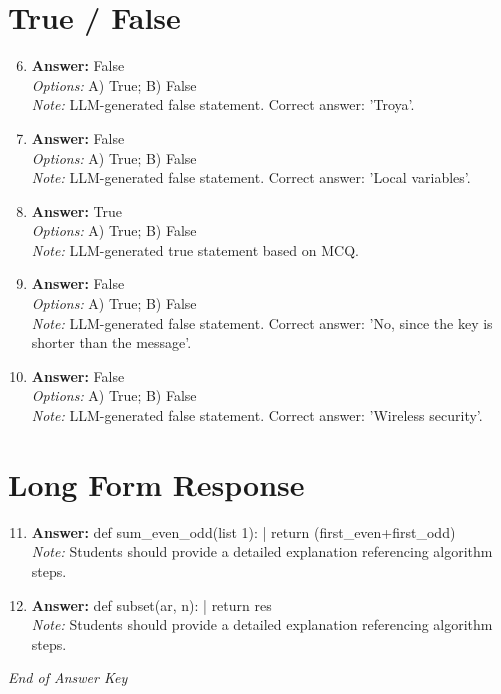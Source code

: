 \documentclass[12pt]{article}
\begin{document}
\section*{True / False}
\begin{enumerate}[label=\arabic*.]
\setcounter{enumi}{5}
\item \textbf{Answer:} False
\\ \textit{Options:} A) True; B) False
\\ \textit{Note:} LLM-generated false statement. Correct answer: 'Troya'.
\item \textbf{Answer:} False
\\ \textit{Options:} A) True; B) False
\\ \textit{Note:} LLM-generated false statement. Correct answer: 'Local variables'.
\item \textbf{Answer:} True
\\ \textit{Options:} A) True; B) False
\\ \textit{Note:} LLM-generated true statement based on MCQ.
\item \textbf{Answer:} False
\\ \textit{Options:} A) True; B) False
\\ \textit{Note:} LLM-generated false statement. Correct answer: 'No, since the key is shorter than the message'.
\item \textbf{Answer:} False
\\ \textit{Options:} A) True; B) False
\\ \textit{Note:} LLM-generated false statement. Correct answer: 'Wireless security'.
\end{enumerate}

\section*{Long Form Response}
\begin{enumerate}[label=\arabic*.]
\setcounter{enumi}{10}
\item \textbf{Answer:} def sum\_even\_odd(list 1): | return (first\_even+first\_odd)
\\ \textit{Note:} Students should provide a detailed explanation referencing algorithm steps.
\item \textbf{Answer:} def subset(ar, n): | return res
\\ \textit{Note:} Students should provide a detailed explanation referencing algorithm steps.
\end{enumerate}

\vfill
\noindent\textit{End of Answer Key}
\end{document}
